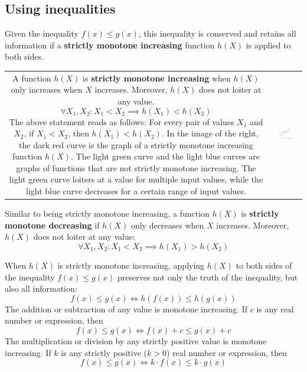 \documentclass{article}
\begin{document}
\subsection*{Using inequalities}

Given the inequality \(f(x) \leq g(x)\), this inequality is conserved and retains all information if a {\bf strictly monotone increasing} function \(h(X)\) is applied to both sides. \\
\begin{tabular}{cc}
\parbox{0.5\textwidth}{
A function \(h(X)\) is {\bf strictly monotone increasing} when \(h(X)\) only increases when \(X\) increases. Moreover, \(h(X)\) does not loiter at any value.
\[\forall X_1, X_2 : X_1 < X_2 \implies h(X_1) < h(X_2)\]
The above statement reads as follows: For every pair of values \(X_1\) and \(X_2\), if \(X_1 < X_2\), then \(h(X_1) < h(X_2)\). \\
In the image of the right, the dark red curve is the graph of a strictly monotone increasing function \(h(X)\). The light green curve and the light blue curves are graphs of functions that are not strictly monotone increasing. The light green curve loiters at a value for multiple input values, while the light blue curve decreases for a certain range of input values. 
} & \parbox{0.5\textwidth}{
\includegraphics[width = 0.5\textwidth]{strictly_monotone_functions}
}
\end{tabular}
Similar to being strictly monotone increasing, a function \(h(X)\) is {\bf strictly monotone decreasing} if \(h(X)\) only decreases when \(X\) increases. Moreover, \(h(X)\) does not loiter at any value:
\[\forall X_1, X_2 : X_1 < X_2 \implies h(X_1) > h(X_2)\]

\vspace{5mm}

When \(h(X)\) is strictly monotone increasing, applying \(h(X)\) to both sides of the inequality \(f(x) \leq g(x)\) preserves not only the truth of the inequality, but also all information:
\[f(x) \leq g(x) \iff h(f(x)) \leq h(g(x))\]
The addition or subtraction of any value is monotone increasing. If \(c\) is any real number or expression, then 
\[f(x) \leq g(x) \iff f(x) + c \leq g(x) + c\]
The multiplication or division by any strictly positive value is monotone increasing. If \(k\) is any strictly positive (\(k > 0\)) real number or expression, then 
\[f(x) \leq g(x) \iff k \cdot f(x) \leq k \cdot g(x)\]  
\end{document}
